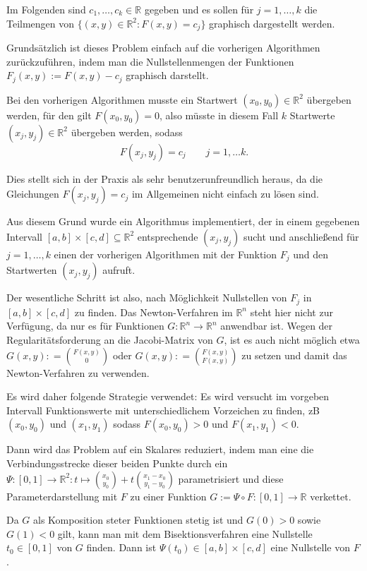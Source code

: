 \documentclass[a4paper,11pt,bibliography=totoc,listof=totoc,headinclude=true,cleardoublepage=empty,oneside]{scrartcl}
\newcommand{\R}{\mathbb{R}}
\renewcommand{\subset}{\subseteq}
\begin{document}
Im Folgenden sind $c_1,\dots, c_k \in \R$ gegeben und es sollen für $j=1,\dots,k$ die Teilmengen von $\{ (x,y) \in \R^2 : F(x,y)=c_j \}$ graphisch dargestellt werden.

Grundsätzlich ist dieses Problem einfach auf die vorherigen Algorithmen zurückzuführen, indem man die Nullstellenmengen der Funktionen $F_j(x,y) := F(x,y) -c_j$ graphisch darstellt.

Bei den vorherigen Algorithmen musste ein Startwert $(x_0,y_0) \in \R^2$ übergeben werden, für den gilt $F(x_0,y_0)=0$, also müsste in diesem Fall $k$ Startwerte $(x_j,y_j) \in \R^2$ übergeben werden, sodass
\[
F(x_j,y_j) = c_j \qquad j=1,\dots k.
\]

Dies stellt sich in der Praxis als sehr benutzerunfreundlich heraus, da die Gleichungen $F(x_j,y_j)=c_j$ im Allgemeinen nicht einfach zu lösen sind. 

Aus diesem Grund wurde ein Algorithmus implementiert, der in einem gegebenen Intervall $[a,b]\times[c,d] \subset \R^2$ entsprechende $(x_j,y_j)$ sucht und anschließend für $j=1,\dots, k$ einen der vorherigen Algorithmen mit der Funktion $F_j$ und den Startwerten $(x_j,y_j)$ aufruft. 

Der wesentliche Schritt ist also, nach Möglichkeit Nullstellen von $F_j$ in $[a,b] \times [c,d]$ zu finden. Das Newton-Verfahren im $\R^n$ steht hier nicht zur Verfügung, da nur es für Funktionen $G: \R^n \to \R^n$ anwendbar ist. Wegen der Regularitätsforderung  an die Jacobi-Matrix von $G$, ist es auch nicht möglich etwa $G(x,y) : = \binom{F(x,y)}{0}$ oder $G(x,y) : = \binom{F(x,y)}{F(x,y)}$ zu setzen und damit das Newton-Verfahren zu verwenden.

Es wird daher folgende Strategie verwendet: Es wird versucht im vorgeben Intervall Funktionswerte mit unterschiedlichem Vorzeichen zu finden, zB $(x_0,y_0)$ und $(x_1,y_1)$ sodass $F(x_0,y_0)>0$ und $F(x_1,y_1)<0$. 

Dann wird das Problem auf ein Skalares reduziert, indem man eine die Verbindungsstrecke dieser beiden Punkte durch ein $\Psi : [0,1] \to \R^2 : t \mapsto \binom{x_0}{y_0} + t \binom{x_1-x_0}{y_1-y_0}$ parametrisiert und diese Parameterdarstellung mit $F$ zu einer Funktion $ G:= \Psi \circ F : [0,1] \to \R$ verkettet. 

Da $G$ als Komposition steter Funktionen stetig ist und $G(0)>0$ sowie $G(1)<0$ gilt, kann man mit dem Bisektionsverfahren eine Nullstelle $t_0 \in [0,1]$ von $G$ finden. Dann ist $\Psi(t_0) \in [a,b] \times [c,d]$ eine Nullstelle von $F$.
\end{document}
